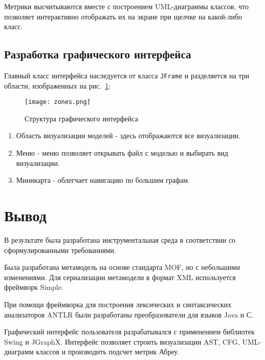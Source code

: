 Метрики высчитываются вместе с построением UML-диаграммы классов, что позволяет
интерактивно отображать их на экране при щелчке на какой-либо класс.

\subsection{Разработка графического интерфейса}

Главный класс интерфейса наследуется от класса \texttt{JFrame} и разделяется на
три области, изображенных на рис.~\ref{fig:zones}:

\begin{figure}[htb]
    \begin{center}
        \texttt{[image: zones.png]}
    \end{center}
    \caption{Структура графического интерфейса}
    \label{fig:zones}
\end{figure}

\begin{enumerate}
    \item Область визуализации моделей - здесь отображаются все визуализации.
    \item Меню - меню позволяет открывать файл с моделью и выбирать вид
    визуализации.
    \item Миникарта - облегчает навигацию по большим графам.
\end{enumerate}

\section{Вывод}

В результате была разработана инструментальная среда в соответствии со
сформулированными требованиями.

Была разработана метамодель на основе стандарта MOF, но с небольшими изменениями.
Для сериализации метамодели в формат XML используется фреймворк Simple.

При помощи фреймворка для построения лексических и синтаксических анализаторов
ANTLR были разработаны преобразователи для языков Java и С.

Графический интерфейс пользователя разрабатывался с применением библиотек Swing
и JGraphX. Интерфейс позволяет строить визуализации AST, CFG, UML-диаграмм
классов и производить подсчет метрик Абреу.
